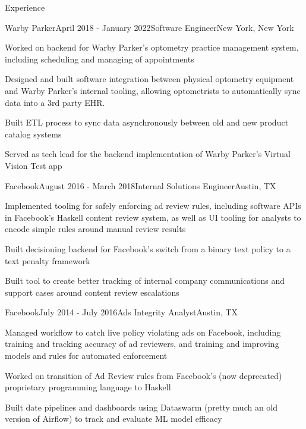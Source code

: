 \documentclass{resume} %
\begin{document}

\begin{rSection}{Experience}

\begin{rSubsection}{Warby Parker}{April 2018 - January 2022}{Software Engineer}{New York, New York}
\item Worked on backend for Warby Parker's optometry practice management system, including scheduling and managing of appointments
\item Designed and built software integration between physical optometry equipment and Warby Parker's internal tooling, allowing optometrists to automatically sync data into a 3rd party EHR.
\item Built ETL process to sync data asynchronously between old and new product catalog systems
\item Served as tech lead for the backend implementation of Warby Parker's Virtual Vision Test app
\end{rSubsection}


\begin{rSubsection}{Facebook}{August 2016 - March 2018}{Internal Solutions Engineer}{Austin, TX}
\item Implemented tooling for safely enforcing ad review rules, including software APIs in Facebook's Haskell content review system, as well as UI tooling for analysts to encode simple rules around manual review results
\item Built decisioning backend for Facebook's switch from a binary text policy to a text penalty framework
\item Built tool to create better tracking of internal company communications and support cases around content review escalations
\end{rSubsection}


\begin{rSubsection}{Facebook}{July 2014 - July 2016}{Ads Integrity Analyst}{Austin, TX}
\item Managed workflow to catch live policy violating ads on Facebook, including training and tracking accuracy of ad reviewers, and training and improving models and rules for automated enforcement
\item Worked on transition of Ad Review rules from Facebook's (now deprecated) proprietary programming language to Haskell
\item Built date pipelines and dashboards using Dataswarm (pretty much an old version of Airflow) to track and evaluate ML model efficacy
\end{rSubsection}

\end{rSection}
\end{document}
